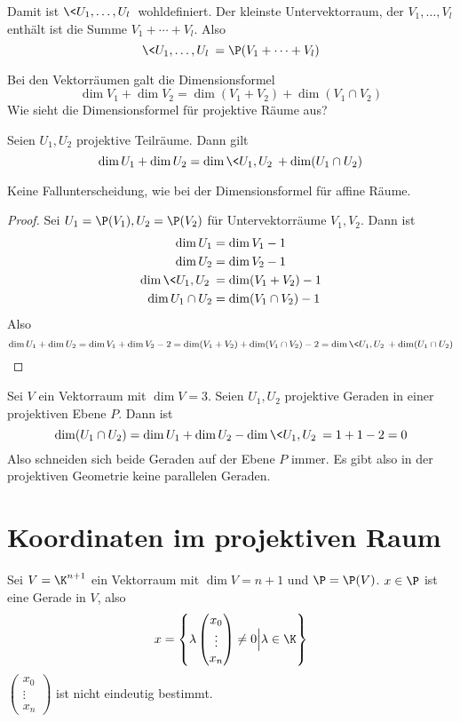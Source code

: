 \documentclass[a4paper, 10pt]{scrbook}
\begin{document}
Damit ist $\<U_1,\dotsc, U_l\>$ wohldefiniert.
Der kleinste Untervektorraum, der $V_1,\dotsc, V_l$ enthält ist die Summe $V_1 + \dotsb + V_l$.
Also
\[
	\<U_1,\dotsc,U_l\> = \P(V_1+\dotsb +V_l)
\]

Bei den Vektorräumen galt die Dimensionsformel
\[
	\dim V_1 + \dim V_2 = \dim (V_1 + V_2) + \dim (V_1\cap V_2)
\]
Wie sieht die Dimensionsformel für projektive Räume aus?

\begin{prop}
	\label{prop:15.4}
	Seien $U_1, U_2$ projektive Teilräume.
	Dann gilt
	\[
		\dim U_1 + \dim U_2 = \dim \<U_1,U_2\> + \dim ( U_1\cap U_2)
	\]
	\begin{note}
		Keine Fallunterscheidung, wie bei der Dimensionsformel für affine Räume.
	\end{note}
	\begin{proof}
		Sei $U_1 = \P(V_1), U_2 = \P(V_2)$ für Untervektorräume $V_1, V_2$.
		Dann ist
		\begin{align*}
			\dim U_1 &= \dim V_1 - 1\\
			\dim U_2 &= \dim V_2 - 1\\
			\dim \<U_1,U_2\> &= \dim (V_1 + V_2) - 1\\
			\dim U_1\cap U_2 &= \dim (V_1 \cap V_2) - 1\\
		\end{align*}
		Also
		\[
			\dim U_1 + \dim U_2 = \dim V_1 + \dim V_2 - 2 = \dim(V_1 + V_2) + \dim (V_1 \cap V_2) - 2 = \dim \<U_1,U_2\> + \dim (U_1\cap U_2)
		\]
	\end{proof}
\end{prop}

\begin{ex}
	Sei $V$ ein Vektorraum mit $\dim V = 3$.
	Seien $U_1, U_2$ projektive Geraden in einer projektiven Ebene $P$.
	Dann ist
	\[
		\dim (U_1 \cap U_2) = \dim U_1 + \dim U_2 - \dim \<U_1,U_2\> = 1 + 1 - 2 = 0
	\]
	Also schneiden sich beide Geraden auf der Ebene $P$ immer.
	Es gibt also in der projektiven Geometrie keine parallelen Geraden.
\end{ex}


\section{Koordinaten im projektiven Raum}


Sei $V = \K^{n+1}$ ein Vektorraum mit $\dim V=n+1$ und $\P = \P(V)$.
$x\in \P$ ist eine Gerade in $V$, also
\[
	x = \left\{ \lambda \begin{pmatrix}x_0\\\vdots \\ x_n\end{pmatrix}\neq 0 \Big| \lambda \in \K\right\}
\]
$\left(\begin{smallmatrix}x_0\\\vdots \\x_n\end{smallmatrix}\right)$ ist nicht eindeutig bestimmt.
\end{document}
